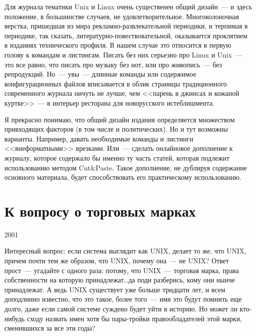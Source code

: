 Для журнала тематики Unix и Linux очень существенен общий дизайн~--- и здесь положение, в большинстве случаев, не удовлетворительное. Многоколоночная верстка, пришедшая из мира рекламно-развлекательной периодики, и терпимая в периодике, так сказать, литературно-повествовательной, оказывается проклятием в изданиях технического профиля. В нашем случае это относится в первую голову к командам и листингам. Писать без них серьезно про Linux и Unix~--- это все равно, что писать про музыку без нот, или про живопись~--- без репродукций. Но~--- увы~--- длинные команды или содержимое конфигурационных файлов вписывается в облик страницы традиционного современного журнала ничуть не лучше, чем <<парень в джинсах и кожаной куртке>>~--- в интерьер ресторана для новорусского истеблишмента.

Я прекрасно понимаю, что общий дизайн издания определяется множеством привходящих факторов (в том числе и политических). Но и тут возможны варианты. Например, давать необходимые команды и листинги <<внеформатными>> врезками. Или~--- сделать онлайновое дополнение к журналу, которое содержало бы именно ту часть статей, которая подлежит использованию методом Cut\&Paste. Такое дополнение, не дублируя содержание основного материала, будет способствовать его практическому использованию.

\section{К вопросу о торговых марках} 
\begin{timeline}2001\end{timeline}
Интересный вопрос: если система выглядит как UNIX, делает то же, что UNIX, причем почти тем же образом, что UNIX, почему она~--- не UNIX? Ответ прост~--- угадайте с одного раза: потому, что UNIX~--- торговая марка, права собственности на которую принадлежат\dots да поди разберись, кому они нынче принадлежат. А ведь UNIX существует уже больше тридцати лет, и всем доподлинно известно, что это такое, более того~--- имя это будут помнить еще долго, даже если самой системе суждено будет уйти в историю. Но может ли кто-нибудь сходу назвать имен хотя бы пары-тройки правообладателей этой марки, сменившихся за все эти годы?

